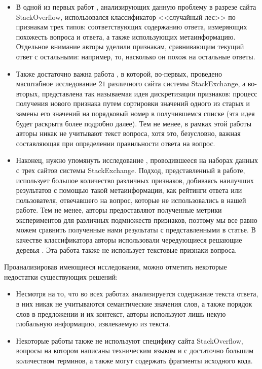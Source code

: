 \documentclass[../diploma.tex]{subfiles}
\begin{document}
	\begin{itemize}
		\item
		В одной из первых работ \cite{article:tian2013}, анализирующих данную проблему в разрезе сайта StackOverflow, 
		использовался классификатор <<случайный лес>> по признакам трех типов:
		соответствующих содержанию ответа, измеряющих похожесть вопроса и ответа, а также использующих метаинформацию.
		Отдельное внимание авторы уделили признакам, сравнивающим текущий ответ с остальными: например, то, насколько он похож на остальные ответы.

		\item
		Также достаточно важна работа \cite{article:gkotsis2014}, в которой, во-первых, проведено масштабное исследование $21$ различного сайта системы StackExchange,
		а во-вторых, представлена так называемая идея дискретизации признаков: 
		процесс получения нового признака путем сортировки значений одного из старых и замены его значений на порядковый номер в получившемся списке 
		(эта идея будет раскрыта более подробно далее).
		Тем не менее, в рамках этой работы авторы никак не учитывают текст вопроса, 
		хотя это, безусловно, важная составляющая при определении правильности ответа на вопрос.

		\item
		Наконец, нужно упомянуть исследование \cite{article:burel2012}, проводившееся на наборах данных с трех сайтов системы StackExchange.
		Подход, представленный в работе, использует большое количество различных признаков, добиваясь наилучших результатов с помощью такой метаинформации, 
		как рейтинги ответа или пользователя, отвечавшего на вопрос, которые не использовались в нашей работе.
		Тем не менее, авторы предоставляют полученные метрики экспериментов для различных подмножеств признаков, 
		поэтому мы все равно можем сравнить полученные нами результаты с представленными в статье.
		В качестве классификатора авторы использовали чередующиеся решающие деревья \cite{article:freund1999}.
		Эта работа также не использует текстовые признаки вопроса.

    \end{itemize}

	Проанализировав имеющиеся исследования, можно отметить некоторые недостатки существующих решений:

	\begin{itemize}

		\item
		Несмотря на то, что во всех работах анализируется содержание текста ответа, в них никак не учитываются семантические значения слов, 
		а также порядок слов в предложении и их контекст, авторы используют лишь некую глобальную информацию, извлекаемую из текста.

		\item
		Некоторые работы также не используют специфику сайта StackOverflow, вопросы на котором написаны техническим языком и с достаточно большим количеством терминов, 
		а также могут содержать фрагменты исходного кода.

	\end{itemize}
\end{document}
